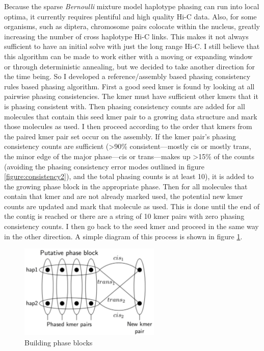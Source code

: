 {\par{
Because the sparse \textit{Bernoulli} mixture model haplotype phasing can run into local optima, it currently requires plentiful and high quality Hi-C data. Also, for some organisms, such as diptera, chromosome pairs colocate within the nucleus\cite{somaticpairing}, greatly increasing the number of cross haplotype Hi-C links. This makes it not always sufficient to have an initial solve with just the long range Hi-C. I still believe that this algorithm can be made to work either with a moving or expanding window or through deterministic annealing, but we decided to take another direction for the time being. So I developed a reference/assembly based phasing consistency rules based phasing algorithm. First a good seed kmer is found by looking at all pairwise phasing consistencies. The kmer must have sufficient other kmers that it is phasing consistent with. Then phasing consistency counts are added for all molecules that contain this seed kmer pair to a growing data structure and mark those molecules as used. I then proceed according to the order that kmers from the paired kmer pair set occur on the assembly. If the kmer pair's phasing consistency counts are sufficient (>90\% consistent---mostly cis or mostly trans, the minor edge of the major phase---cis or trans---makes up >15\% of the counts (avoiding the phasing consistency error modes outlined in figure \ref{figure:consistency2}), and the total phasing counts is at least 10), it is added to the growing phase block in the appropriate phase. Then for all molecules that contain that kmer and are not already marked used, the potential new kmer counts are updated and mark that molecule as used. This is done until the end of the contig is reached or there are a string of 10 kmer pairs with zero phasing consistency counts. I then go back to the seed kmer and proceed in the same way in the other direction. A simple diagram of this process is shown in figure \ref{figure:phaseblocks}.
}

\begin{figure}[htbp!]
\caption{Building phase blocks}
\label{figure:phaseblocks}
\begin{centering}
\includegraphics[width=0.6\textwidth]{phaseblockbuilding.png}
\end{centering}
\end{figure}

}

